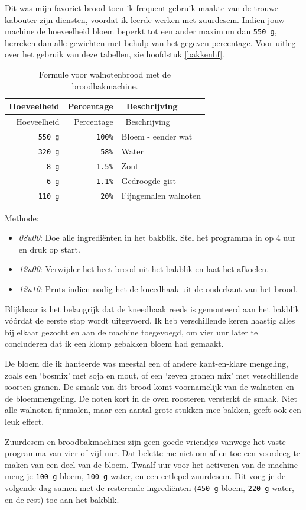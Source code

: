 \documentclass[
  11pt,
  dutch,
]{memoir}
\providecommand{\tightlist}{%
  \setlength{\itemsep}{0pt}\setlength{\parskip}{0pt}}
\begin{document}
Dit was mijn favoriet brood toen ik frequent gebruik maakte van de
trouwe kabouter zijn diensten, voordat ik leerde werken met zuurdesem.
Indien jouw machine de hoeveelheid bloem beperkt tot een ander maximum
dan \texttt{550\ g}, herreken dan alle gewichten met behulp van het
gegeven percentage. Voor uitleg over het gebruik van deze tabellen, zie
hoofdstuk \ref{bakkenhf}.

\begin{longtable}[]{@{}rrl@{}}
\caption{Formule voor walnotenbrood met de
broodbakmachine.}\tabularnewline
\toprule
Hoeveelheid & Percentage & ~Beschrijving\tabularnewline
\midrule
\endfirsthead
\toprule
Hoeveelheid & Percentage & ~Beschrijving\tabularnewline
\midrule
\endhead
\texttt{550\ g} & \texttt{100\%} & Bloem - eender wat\tabularnewline
\texttt{320\ g} & \texttt{58\%} & Water\tabularnewline
\texttt{8\ g} & \texttt{1.5\%} & Zout\tabularnewline
\texttt{6\ g} & \texttt{1.1\%} & Gedroogde gist\tabularnewline
~\texttt{110\ g} & \texttt{20\%} & Fijngemalen walnoten\tabularnewline
\bottomrule
\end{longtable}

Methode:

\begin{itemize}
\tightlist
\item
  \emph{08u00}: Doe alle ingrediënten in het bakblik. Stel het programma
  in op 4 uur en druk op start.
\item
  \emph{12u00}: Verwijder het heet brood uit het bakblik en laat het
  afkoelen.
\item
  \emph{12u10}: Pruts indien nodig het de kneedhaak uit de onderkant van
  het brood.
\end{itemize}

Blijkbaar is het belangrijk dat de kneedhaak reeds is gemonteerd aan het
bakblik vóórdat de eerste stap wordt uitgevoerd. Ik heb verschillende
keren haastig alles bij elkaar gezocht en aan de machine toegevoegd, om
vier uur later te concluderen dat ik een klomp gebakken bloem had
gemaakt.

De bloem die ik hanteerde was meestal een of andere kant-en-klare
mengeling, zoals een `bosmix' met soja en mout, of een `zeven granen
mix' met verschillende soorten granen. De smaak van dit brood komt
voornamelijk van de walnoten en de bloemmengeling. De noten kort in de
oven roosteren versterkt de smaak. Niet alle walnoten fijnmalen, maar
een aantal grote stukken mee bakken, geeft ook een leuk effect.

Zuurdesem en broodbakmachines zijn geen goede vriendjes vanwege het
vaste programma van vier of vijf uur. Dat belette me niet om af en toe
een voordeeg te maken van een deel van de bloem. Twaalf uur voor het
activeren van de machine meng je \texttt{100\ g} bloem, \texttt{100\ g}
water, en een eetlepel zuurdesem. Dit voeg je de volgende dag samen met
de resterende ingrediënten (\texttt{450\ g} bloem, \texttt{220\ g}
water, en de rest) toe aan het bakblik.
\end{document}
